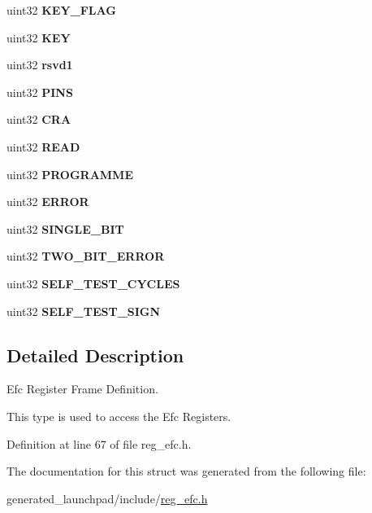 \begin{DoxyCompactItemize}
uint32 {\bfseries K\+E\+Y\+\_\+\+F\+L\+AG}
\item 
\mbox{\label{structefcBase_a993e739d8e5d49614ee5549b99bcdf14}} 
uint32 {\bfseries K\+EY}
\item 
\mbox{\label{structefcBase_a9e69353d8c3f047fe62f3d09bea494e9}} 
uint32 {\bfseries rsvd1}
\item 
\mbox{\label{structefcBase_a41af142aba37fd019efab1eb2a8faec8}} 
uint32 {\bfseries P\+I\+NS}
\item 
\mbox{\label{structefcBase_aa08b572b0b6513ec343c3557e7fb4d14}} 
uint32 {\bfseries C\+RA}
\item 
\mbox{\label{structefcBase_adfbc994e163959c8657ed10a942ca924}} 
uint32 {\bfseries R\+E\+AD}
\item 
\mbox{\label{structefcBase_a28d4f39a8d880331b541d54905f53402}} 
uint32 {\bfseries P\+R\+O\+G\+R\+A\+M\+ME}
\item 
\mbox{\label{structefcBase_ac35bc0707b988a82ecc1f4a10e71f4fc}} 
uint32 {\bfseries E\+R\+R\+OR}
\item 
\mbox{\label{structefcBase_ae701654b0dd9e6f579e3d38cead2eddd}} 
uint32 {\bfseries S\+I\+N\+G\+L\+E\+\_\+\+B\+IT}
\item 
\mbox{\label{structefcBase_a41e107b6df57e09a4b4622b175c47e7e}} 
uint32 {\bfseries T\+W\+O\+\_\+\+B\+I\+T\+\_\+\+E\+R\+R\+OR}
\item 
\mbox{\label{structefcBase_a79b5a3e9c8b9d1640d0b8bdc1d3a966d}} 
uint32 {\bfseries S\+E\+L\+F\+\_\+\+T\+E\+S\+T\+\_\+\+C\+Y\+C\+L\+ES}
\item 
\mbox{\label{structefcBase_a1650cccafa3e79df8cf0bd3bbf6fb555}} 
uint32 {\bfseries S\+E\+L\+F\+\_\+\+T\+E\+S\+T\+\_\+\+S\+I\+GN}
\end{DoxyCompactItemize}


\subsection{Detailed Description}
Efc Register Frame Definition. 

This type is used to access the Efc Registers. 

Definition at line 67 of file reg\+\_\+efc.\+h.



The documentation for this struct was generated from the following file\+:\begin{DoxyCompactItemize}
\item 
generated\+\_\+launchpad/include/\mbox{\hyperlink{reg__efc_8h}{reg\+\_\+efc.\+h}}\end{DoxyCompactItemize}
